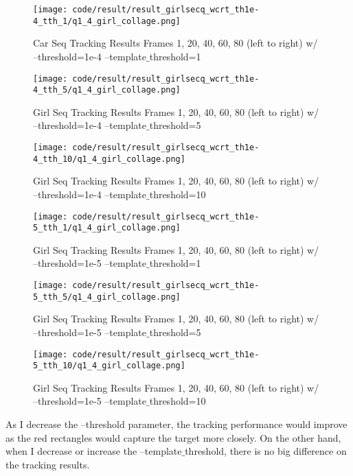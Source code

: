 \documentclass{article}
\begin{document}
	\begin{figure}[H]		
	\centering
	\texttt{[image: code/result/result\_girlsecq\_wcrt\_th1e-4\_tth\_1/q1\_4\_girl\_collage.png]}  %
	\caption{Car Seq Tracking Results Frames 1, 20, 40, 60, 80 (left to right) w/ --threshold=1e-4 --template$\_$threshold=1}
	\label{fig:girl_th1e-4_tth1}
	\end{figure}
	\begin{figure}[H]		
	\centering
	\texttt{[image: code/result/result\_girlsecq\_wcrt\_th1e-4\_tth\_5/q1\_4\_girl\_collage.png]}  %
	\caption{Girl Seq Tracking Results Frames 1, 20, 40, 60, 80 (left to right) w/ --threshold=1e-4 --template$\_$threshold=5}
	\label{fig:girl_th1e-4_tth5}
	\end{figure}
	\begin{figure}[H]		
	\centering
	\texttt{[image: code/result/result\_girlsecq\_wcrt\_th1e-4\_tth\_10/q1\_4\_girl\_collage.png]}  %
	\caption{Girl Seq Tracking Results Frames 1, 20, 40, 60, 80 (left to right) w/ --threshold=1e-4 --template$\_$threshold=10}
	\label{fig:girl_th1e-4_tth10}
	\end{figure}
	\begin{figure}[H]		
	\centering
	\texttt{[image: code/result/result\_girlsecq\_wcrt\_th1e-5\_tth\_1/q1\_4\_girl\_collage.png]}  %
	\caption{Girl Seq Tracking Results Frames 1, 20, 40, 60, 80 (left to right) w/ --threshold=1e-5 --template$\_$threshold=1}
	\label{fig:girl_th1e-5_tth1}
	\end{figure}
	\begin{figure}[H]		
	\centering
	\texttt{[image: code/result/result\_girlsecq\_wcrt\_th1e-5\_tth\_5/q1\_4\_girl\_collage.png]}  %
	\caption{Girl Seq Tracking Results Frames 1, 20, 40, 60, 80 (left to right) w/ --threshold=1e-5 --template$\_$threshold=5}
	\label{fig:girl_th1e-5_tth5}
	\end{figure}
	\begin{figure}[H]		
	\centering
	\texttt{[image: code/result/result\_girlsecq\_wcrt\_th1e-5\_tth\_10/q1\_4\_girl\_collage.png]}  %
	\caption{Girl Seq Tracking Results Frames 1, 20, 40, 60, 80 (left to right) w/ --threshold=1e-5 --template$\_$threshold=10}
	\label{fig:girl_th1e-5_tth10}
	\end{figure}
	
	As I decrease the --threshold parameter, the tracking performance would improve as the red rectangles would capture the target more closely. On the other hand, when I decrease or increase the --template$\_$threshold, there is no big difference on the tracking results.
	
\end{document}
